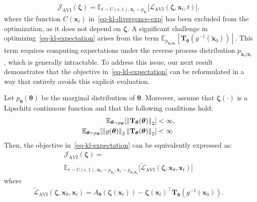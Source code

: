 \begin{equation}
\label{eq-kl-expectation}
\mathcal{J}_{\text{AVI}}(\boldsymbol{\zeta}) = \mathbb{E}_{t\sim U(\epsilon, 1), \mathbf{x}_t \sim p_{\mathbf{x}_t}}\Big[ \mathcal{L}_{\text{AVI}}(\boldsymbol{\zeta},\mathbf{x}_t,t)\Big].
\end{equation}
where the function $C(\mathbf{x}_t)$ in~\eqref{eq-kl-divergence-exp} has been excluded from the optimization, as it does not depend on $\boldsymbol{\zeta}$. 
A significant challenge in optimizing~\eqref{eq-kl-expectation} arises from the term $\mathbb{E}_{p_{\tilde{\mathbf{x}}_{0}|\mathbf{x}_t}}[\mathbf{T}_{\boldsymbol{\theta}}(g^{-1}(\tilde{\mathbf{x}}_{0}))]$. This term requires computing expectations under the reverse process distribution $p_{\tilde{\mathbf{x}}_{0}|\mathbf{x}_t}$, which is generally intractable. To address this issue, our next result demonstrates that the objective in~\eqref{eq-kl-expectation} can be reformulated in a way that entirely avoids this explicit evaluation.
\begin{theorem}
\label{prop-new-objective}
Let $p_{\boldsymbol{\theta}}(\boldsymbol{\theta})$ be the marginal distribution of $\boldsymbol{\theta}$.  Moreover, assume that $\boldsymbol{\zeta}(\cdot)$ is a Lipschitz continuous function and that the following conditions hold:
\begin{equation*}
\begin{aligned}
\mathbb{E}_{\boldsymbol{\theta}\sim  p_{\boldsymbol{\theta}}}[\left\lVert \mathbf{T}_{\boldsymbol{\theta}}(\boldsymbol{\theta})  \right\rVert_2] &< \infty,\\
\mathbb{E}_{\boldsymbol{\theta}\sim  p_{\boldsymbol{\theta}}}[\left\lVert g(\boldsymbol{\theta}) \right\rVert_2\left\lVert \mathbf{T}_{\boldsymbol{\theta}}(\boldsymbol{\theta})  \right\rVert_2] &< \infty 
\end{aligned}
\end{equation*}
Then, the objective in~\eqref{eq-kl-expectation} can be equivalently expressed as:
\begin{multline}
\label{eq-amortized-objective}
\mathcal{J}_{\text{AVI}}(\boldsymbol{\zeta}) = \\  \mathbb{E}_{t\sim U(\epsilon, 1), \mathbf{x}_0\sim  p_{\mathbf{x}_0}, \mathbf{x}_t \sim p_{\mathbf{x}_t|\mathbf{x}_0}}\Big[ \tilde{\mathcal{L}}_{\text{AVI}}(\boldsymbol{\zeta}, \mathbf{x}_0,\mathbf{x}_t)\Big]
\end{multline}
where
\begin{multline*}
\tilde{\mathcal{L}}_{\text{AVI}}(\boldsymbol{\zeta}, \mathbf{x}_0,\mathbf{x}_t) =  A_{\boldsymbol{\theta}}(\boldsymbol{\zeta}(\mathbf{x}_t))  - \boldsymbol{\zeta}(\mathbf{x}_t)^{\top}\mathbf{T}_{\boldsymbol{\theta}}(g^{-1}(\mathbf{x}_{0})).
\end{multline*}
\end{theorem}
